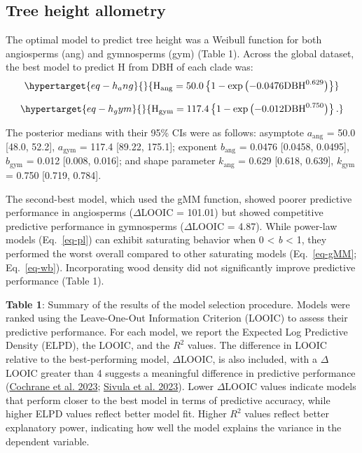 \documentclass[
  12pt,
  letterpaper,
  DIV=11,
  numbers=noendperiod]{scrartcl}
\begin{document}
\hypertarget{tree-height-allometry}{%
\subsection{Tree height allometry}\label{tree-height-allometry}}

The optimal model to predict tree height was a Weibull function for both
angiosperms (ang) and gymnosperms (gym) (Table 1). Across the global
dataset, the best model to predict H from DBH of each clade was:
\begin{equation}\protect\hypertarget{eq-h_ang}{}{
\mathrm{H_{ang}} =50.0
\left\{ 1 - \exp\left( - 0.0476
\mathrm{DBH}^{0.629}
\right) \right\}
}\label{eq-h_ang}\end{equation}

\begin{equation}\protect\hypertarget{eq-h_gym}{}{
\mathrm{H_{gym}} = 117.4
\left\{ 1 - \exp\left( - 0.012
\mathrm{DBH}^{0.750}
\right) \right\}.
}\label{eq-h_gym}\end{equation}

The posterior medians with their 95\% CIs were as follows: asymptote
\(a_{\text{ang}}\) = 50.0 {[}48.0, 52.2{]}, \(a_{\text{gym}}\) = 117.4
{[}89.22, 175.1{]}; exponent \(b_{\text{ang}}\) = 0.0476 {[}0.0458,
0.0495{]}, \(b_{\text{gym}}\) = 0.012 {[}0.008, 0.016{]}; and shape
parameter \(k_{\text{ang}}\) = 0.629 {[}0.618, 0.639{]},
\(k_{\text{gym}}\) = 0.750 {[}0.719, 0.784{]}.

The second-best model, which used the gMM function, showed poorer
predictive performance in angiosperms (\(\Delta\)LOOIC = 101.01) but
showed competitive predictive performance in gymnosperms
(\(\Delta\)LOOIC = 4.87). While power-law models (Eq.~\ref{eq-pl}) can
exhibit saturating behavior when 0 \textless{} \emph{b} \textless{} 1,
they performed the worst overall compared to other saturating models
(Eq.~\ref{eq-gMM}; Eq.~\ref{eq-wb}). Incorporating wood density did not
significantly improve predictive performance (Table 1).

\textbf{Table 1}: Summary of the results of the model selection
procedure. Models were ranked using the Leave-One-Out Information
Criterion (LOOIC) to assess their predictive performance. For each
model, we report the Expected Log Predictive Density (ELPD), the LOOIC,
and the \(R^2\) values. The difference in LOOIC relative to the
best-performing model, \(\Delta\)LOOIC, is also included, with a
\(\Delta\)LOOIC greater than 4 suggests a meaningful difference in
predictive performance (\protect\hyperlink{ref-Cochrane2023}{Cochrane et
al. 2023}; \protect\hyperlink{ref-Sivula2023}{Sivula et al. 2023}).
Lower \(\Delta\)LOOIC values indicate models that perform closer to the
best model in terms of predictive accuracy, while higher ELPD values
reflect better model fit. Higher \(R^2\) values reflect better
explanatory power, indicating how well the model explains the variance
in the dependent variable.
\end{document}
